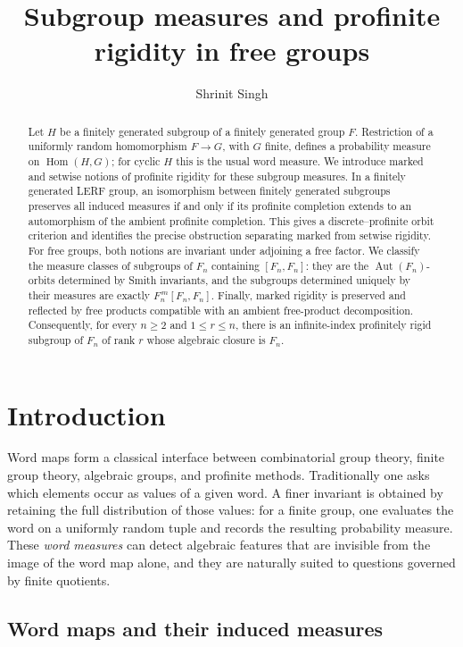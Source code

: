 \documentclass[11pt]{amsart}
\title[Subgroup measures and profinite rigidity]
{Subgroup measures and profinite rigidity in free groups}
\author{Shrinit Singh}
\theoremstyle{plain}
\theoremstyle{definition}
\newcommand{\Hom}{\operatorname{Hom}}
\newcommand{\Aut}{\operatorname{Aut}}
\begin{document}
\begin{abstract}
Let $H$ be a finitely generated subgroup of a finitely generated group $F$.
Restriction of a uniformly random homomorphism $F\to G$, with $G$ finite,
defines a probability measure on $\Hom(H,G)$; for cyclic $H$ this is the usual
word measure.  We introduce marked and setwise notions of profinite rigidity
for these subgroup measures.  In a finitely generated LERF group, an
isomorphism between finitely generated subgroups preserves all induced
measures if and only if its profinite completion extends to an automorphism of
the ambient profinite completion.  This gives a discrete--profinite orbit
criterion and identifies the precise obstruction separating marked from
setwise rigidity.  For free groups, both notions are invariant under adjoining
a free factor.  We classify the measure classes of subgroups of $F_n$
containing $[F_n,F_n]$: they are the $\Aut(F_n)$-orbits determined by Smith
invariants, and the subgroups determined uniquely by their measures are
exactly $F_n^{\,m}[F_n,F_n]$.  Finally, marked rigidity is preserved and
reflected by free products compatible with an ambient free-product
decomposition.  Consequently, for every $n\ge2$ and $1\le r\le n$, there is
an infinite-index profinitely rigid subgroup of $F_n$ of rank $r$ whose
algebraic closure is $F_n$.
\end{abstract}


\maketitle


\section{Introduction}\label{sec:intro}

Word maps form a classical interface between combinatorial group theory, finite
group theory, algebraic groups, and profinite methods. Traditionally one asks
which elements occur as values of a given word. A finer invariant is obtained
by retaining the full distribution of those values: for a finite group, one
evaluates the word on a uniformly random tuple and records the resulting
probability measure. These \emph{word measures} can detect algebraic features
that are invisible from the image of the word map alone, and they are naturally
suited to questions governed by finite quotients.

\subsection{Word maps and their induced measures}\label{sec:words}
\end{document}
